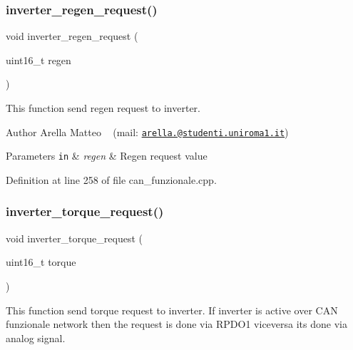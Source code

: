 \subsubsection{\texorpdfstring{inverter\+\_\+regen\+\_\+request()}{inverter\_regen\_request()}}
{\footnotesize\ttfamily void inverter\+\_\+regen\+\_\+request (\begin{DoxyParamCaption}\item[{uint16\+\_\+t}]{regen }\end{DoxyParamCaption})}



This function send regen request to inverter. 

\begin{DoxyAuthor}{Author}
Arella Matteo ~\newline
 (mail\+: \href{mailto:arella.1646983@studenti.uniroma1.it}{\tt arella.@studenti.\+uniroma1.\+it})
\end{DoxyAuthor}

\begin{DoxyParams}[1]{Parameters}
\mbox{\tt in}  & {\em regen} & Regen request value \\
\hline
\end{DoxyParams}


Definition at line 258 of file can\+\_\+funzionale.\+cpp.

\mbox{\label{group___c_a_n__funzionale__group_ga41854ab275f2b3cb7efb9385502d7d65}} 
\subsubsection{\texorpdfstring{inverter\+\_\+torque\+\_\+request()}{inverter\_torque\_request()}}
{\footnotesize\ttfamily void inverter\+\_\+torque\+\_\+request (\begin{DoxyParamCaption}\item[{uint16\+\_\+t}]{torque }\end{DoxyParamCaption})}



This function send torque request to inverter. If inverter is active over C\+AN funzionale network then the request is done via R\+P\+D\+O1 viceversa it\textquotesingle{}s done via analog signal. 

